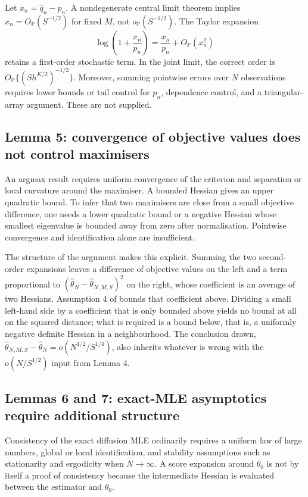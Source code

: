 \documentclass[11pt]{article}
\theoremstyle{definition}
\newcommand{\Pp}{\mathbb{P}}
\newcommand{\thetao}{\theta_0}
\begin{document}
Let $x_n=\widehat q_n-p_n$. A nondegenerate central limit theorem implies $x_n=O_{\Pp}(S^{-1/2})$ for fixed $M$, not $o_{\Pp}(S^{-1/2})$. The Taylor expansion
\[
\log\left(1+\frac{x_n}{p_n}\right)
=\frac{x_n}{p_n}+O_{\Pp}(x_n^2)
\]
retains a first-order stochastic term. In the joint limit, the correct order is $O_{\Pp}\{(S h^{K/2})^{-1/2}\}$. Moreover, summing pointwise errors over $N$ observations requires lower bounds or tail control for $p_n$, dependence control, and a triangular-array argument. These are not supplied.

\subsection{Lemma 5: convergence of objective values does not control maximisers}

An argmax result requires uniform convergence of the criterion and separation or local curvature around the maximiser. A bounded Hessian gives an upper quadratic bound. To infer that two maximisers are close from a small objective difference, one needs a lower quadratic bound or a negative Hessian whose smallest eigenvalue is bounded away from zero after normalisation. Pointwise convergence and identification alone are insufficient.

The structure of the argument makes this explicit. Summing the two second-order expansions leaves a difference of objective values on the left and a term proportional to $(\widehat\theta_N-\widehat\theta_{N,M,S})^2$ on the right, whose coefficient is an average of two Hessians. Assumption 4 of \citet{BrandtSantaClara2002} bounds that coefficient above. Dividing a small left-hand side by a coefficient that is only bounded above yields no bound at all on the squared distance; what is required is a bound below, that is, a uniformly negative definite Hessian in a neighbourhood. The conclusion drawn, $\widehat\theta_{N,M,S}-\widehat\theta_N=o(N^{1/2}/S^{1/4})$, also inherits whatever is wrong with the $o(N/S^{1/2})$ input from Lemma 4.

\subsection{Lemmas 6 and 7: exact-MLE asymptotics require additional structure}

Consistency of the exact diffusion MLE ordinarily requires a uniform law of large numbers, global or local identification, and stability assumptions such as stationarity and ergodicity when $N\to\infty$. A score expansion around $\thetao$ is not by itself a proof of consistency because the intermediate Hessian is evaluated between the estimator and $\thetao$.
\end{document}
